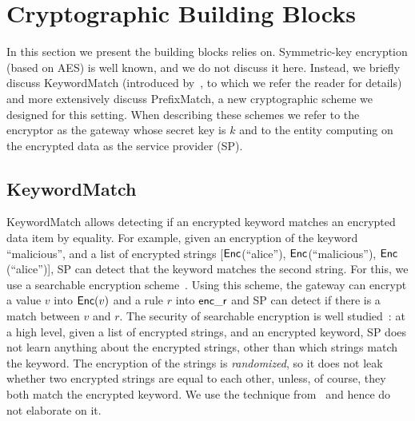 


\section{Cryptographic Building Blocks}
\label{sec:buildingblocks}

In this section we present the building blocks \sys relies on.
Symmetric-key encryption (based on AES) is well known, and we do not discuss it here. Instead, we briefly discuss KeywordMatch (introduced by~\cite{blindbox}, to which we refer the reader for details) and more extensively discuss PrefixMatch, a new cryptographic scheme we designed for this setting.
When describing these schemes we refer to the encryptor as the gateway whose secret key is $k$ and to the entity computing on the encrypted data as the service provider (SP).


\subsection{KeywordMatch}\label{s:kwmatch}


KeywordMatch allows detecting if an encrypted keyword matches an encrypted data item by equality.
For example, given an encryption of the keyword ``malicious'', and a list of encrypted strings  [$\mathsf{Enc}$(``alice''), $\mathsf{Enc}$(``malicious''), $\mathsf{Enc}$(``alice'')], SP can  detect that the keyword matches the second string. 
For  this, we use a searchable encryption scheme~\cite{song:search, blindbox}.
Using this scheme, the gateway can encrypt a value $v$ into $\mathsf{Enc}(v)$ and a rule $r$ into $\mathsf{enc\_r}$ and SP can detect if there is a match between $v$ and $r$. 
 The security of searchable encryption is well studied~\cite{song:search, blindbox}: at a high level,  given a list of encrypted strings, and an encrypted keyword, SP does not learn anything about the encrypted strings, other than which strings match the keyword. 
 The encryption of the strings is {\em randomized}, so it does not leak whether two encrypted strings are equal to each other, unless, of course, they both match the encrypted keyword. 
  We use the technique from~\cite{blindbox} and hence do not elaborate on it.


